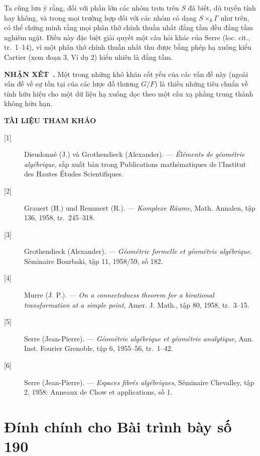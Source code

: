 \documentclass[11pt,twoside,openany]{book}
\numberwithin{equation}{section}
\newcommand{\src}[1]{%
  \phantomsection\hypertarget{src:\fgasourceid:#1}{}%
  \marginpar{\raggedleft\footnotesize\sffamily #1}%
}
\newcommand{\fgasourceid}{unset}
\newcommand{\sid}[1]{\gdef\fgasourceid{#1}\phantomsection\hypertarget{fga:#1}{}}
\newcommand{\result}[2]{\par\medskip\noindent\textbf{#1\if\relax\detokenize{#2}\relax\else\ #2\fi.}\quad}
\begin{document}
Ta cũng lưu ý rằng, đối với phần lớn các nhóm trơn trên $S$ đã biết, dù tuyến
tính hay không, và trong mọi trường hợp đối với các nhóm có dạng
$S\times_k\Gamma$ như trên, có thể chứng minh rằng mọi phân thớ chính thuần nhất
đẳng tầm đều đẳng tầm nghiêm ngặt. Điều này đặc biệt giải quyết một câu hỏi khác
của Serre (loc. cit., tr.~1--14), vì một phân thớ chính thuần nhất thu được bằng
phép hạ xuống kiểu Cartier (xem đoạn 3, Ví dụ 2) hiển nhiên là đẳng tầm.

\result{NHẬN XÉT}{} Một trong những khó khăn cốt yếu của các vấn đề này (ngoài
vấn đề về sự tồn tại của các lược đồ thương $G/F$) là thiếu những tiêu chuẩn về
tính hữu hiệu cho một dữ liệu hạ xuống dọc theo một cấu xạ phẳng trung thành
không hữu hạn.

\src{327}
\begin{center}
  \textbf{TÀI LIỆU THAM KHẢO}
\end{center}

\begin{description}
  \item[{[1]}] Dieudonné (J.) và Grothendieck (Alexander). --- \emph{Éléments
    de géométrie algébrique}, sắp xuất bản trong Publications mathématiques de
    l'Institut des Hautes Études Scientifiques.
  \item[{[2]}] Grauert (H.) und Remmert (R.). --- \emph{Komplexe Räume}, Math.
    Annalen, tập 136, 1958, tr.~245--318.
  \item[{[3]}] Grothendieck (Alexander). --- \emph{Géométrie formelle et
    géométrie algébrique}. Séminaire Bourbaki, tập 11, 1958/59, số 182.
  \item[{[4]}] Murre (J. P.). --- \emph{On a connectedness theorem for a
    birational transformation at a simple point}, Amer. J. Math., tập 80, 1958,
    tr.~3--15.
  \item[{[5]}] Serre (Jean-Pierre). --- \emph{Géométrie algébrique et géométrie
    analytique}, Ann. Inst. Fourier Grenoble, tập 6, 1955--56, tr.~1--42.
  \item[{[6]}] Serre (Jean-Pierre). --- \emph{Espaces fibrés algébriques},
    Séminaire Chevalley, tập 2, 1958: Anneaux de Chow et applications, số 1.
\end{description}

\par

\clearpage
\chapter*{Đính chính cho Bài trình bày số 190}
\setcounter{footnote}{0}
\sid{e190}
\src{300}
\end{document}
